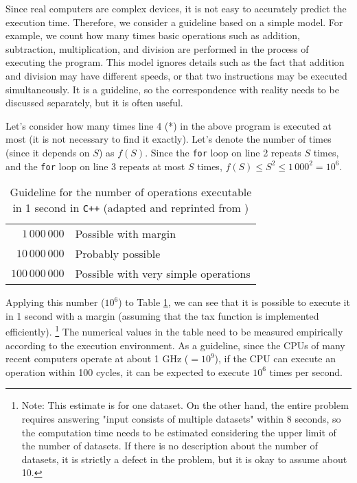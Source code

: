 Since real computers are complex devices, it is not easy to accurately predict the execution time. Therefore, we consider a guideline based on a simple model.
For example, we count how many times basic operations such as addition, subtraction, multiplication, and division are performed in the process of executing the program. This model ignores details such as the fact that addition and division may have different speeds, or that two instructions may be executed simultaneously. It is a guideline, so the correspondence with reality needs to be discussed separately, but it is often useful.

Let's consider how many times line 4 (*) in the above program is executed at most (it is not necessary to find it exactly).
Let's denote the number of times (since it depends on $S$) as $f(S)$. Since the \texttt{for} loop on line 2 repeats $S$ times, and the \texttt{for} loop on line 3 repeats at most $S$ times, $f(S) \le S^2 \le 1\,000^2=10^6$.

\begin{table}[h]
  \centering
  \caption{Guideline for the number of operations executable in 1 second in \texttt{C++} (adapted and reprinted from \cite{book:pcc})}
  \label{table:empirical-estimation}
  \begin{tabular}{rl}\hline
    $1\,000\,000$  &Possible with margin\\
    $10\,000\,000$ &Probably possible\\
    $100\,000\,000$&Possible with very simple operations\\\hline
  \end{tabular}
\end{table}

Applying this number ($10^6$) to Table \ref{table:empirical-estimation}, we can see that it is possible to execute it in 1 second with a margin (assuming that the tax function is implemented efficiently). \footnote{Note: This estimate is for one dataset. On the other hand, the entire problem requires answering "input consists of multiple datasets" within 8 seconds, so the computation time needs to be estimated considering the upper limit of the number of datasets. If there is no description about the number of datasets, it is strictly a defect in the problem, but it is okay to assume about 10.}
The numerical values in the table need to be measured empirically according to the execution environment.
As a guideline, since the CPUs of many recent computers operate at about 1 GHz ($=10^{9}$), if the CPU can execute an operation within 100 cycles, it can be expected to execute $10^6$ times per second.


